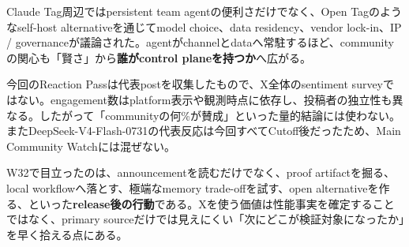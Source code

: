 \begin{communitynote}
Claude Tag周辺ではpersistent team agentの便利さだけでなく、Open Tagのようなself-host alternativeを通じてmodel choice、data residency、vendor lock-in、IP / governanceが議論された\cite{claude-tag-x-opentag,claude-tag-x-governance}。agentがchannelとdataへ常駐するほど、communityの関心も「賢さ」から\textbf{誰がcontrol planeを持つか}へ広がる。
\end{communitynote}

\begin{claimboundary}
今回のReaction Passは代表postを収集したもので、X全体のsentiment surveyではない。engagement数はplatform表示や観測時点に依存し、投稿者の独立性も異なる。したがって「communityの何\%が賛成」といった量的結論には使わない。またDeepSeek-V4-Flash-0731の代表反応は今回すべてCutoff後だったため、Main Community Watchには混ぜない。
\end{claimboundary}

W32で目立ったのは、announcementを読むだけでなく、proof artifactを掘る、local workflowへ落とす、極端なmemory trade-offを試す、open alternativeを作る、といった\textbf{release後の行動}である。Xを使う価値は性能事実を確定することではなく、primary sourceだけでは見えにくい「次にどこが検証対象になったか」を早く拾える点にある。
